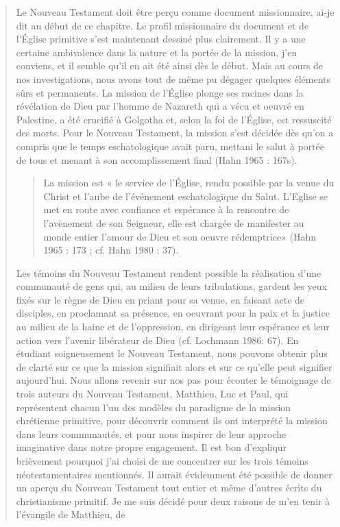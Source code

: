 \begin{quote}
Le Nouveau Testament doit être perçu comme document
missionnaire, ai-je dit au début de ce chapitre. Le profil missionnaire
du document et de l'Église primitive s'est maintenant dessiné plus
clairement. Il y a une certaine ambivalence dans la nature et la portée
de la mission, j'en conviens, et il semble qu'il en ait été ainsi dès le
début. Mais au cours de nos investigations, nous avons tout de même
pu dégager quelques éléments sûrs et permanents. La mission de
l'Église plonge ses racines dans la révélation de Dieu par l'homme de
Nazareth qui a vécu et oeuvré en Palestine, a été crucifié à Golgotha et,
selon la foi de l'Église, est ressuscité des morts. Pour le Nouveau
Testament, la mission s'est décidée dès qu'on a compris que le temps
eschatologique avait paru, mettani le salut à portée de tous et menant à
son accomplissement final (Hahn 1965 : 167s). 
\begin{quote}
La mission est « le
service de l'Église, rendu possible par la venue du Christ et l'aube de l'événement eschatologique du Salut. L'Eglise se met en route avec confiance et espérance à la rencontre de l'avènement de son Seigneur, 
    elle est chargée de manifester au monde entier l'amour de Dieu et son
oeuvre rédemptrice» (Hahn 1965 : 173 ; cf. Hahn 1980 : 37).
\end{quote}
 Les
témoins du Nouveau Testament rendent possible la réalisation d'une
communauté de gens qui, au milieu de leurs tribulations, gardent les
yeux fixés sur le règne de Dieu en priant pour sa venue, en faisant acte
de disciples, en proclamant sa présence, en oeuvrant pour la paix et la
justice au milieu de la haine et de l'oppression, en dirigeant leur
espérance et leur action vers l'avenir libérateur de Dieu (cf. Lochmann
1986: 67).
En étudiant soigneusement le Nouveau Testament, nous pouvons
obtenir plus de clarté sur ce que la mission signifiait alors et sur ce
qu'elle peut signifier aujourd'hui. Nous allons revenir sur nos pas
pour écouter le témoignage de trois auteurs du Nouveau Testament,
Matthieu, Luc et Paul, qui représentent chacun l'un des modèles du
paradigme de la mission chrétienne primitive, pour découvrir
comment ils ont interprété la mission dans leurs communautés, et pour
nous inspirer de leur approche imaginative dans notre propre
engagement.
Il est bon d'expliqur brièvement pourquoi j'ai choisi de me
concentrer sur les trois témoins néotestamentaires mentionnés. Il aurait
évidemment été possible de donner un aperçu du Nouveau Testament
tout entier et même d'autres écrits du christianisme primitif. Je me suis
décidé pour deux raisons de m'en tenir à l'évangile de Matthieu, de

\end{quote}

